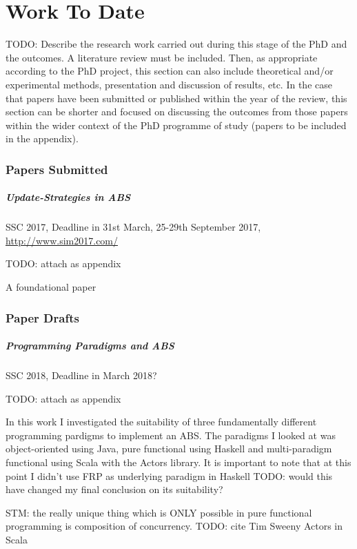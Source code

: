 \chapter{Work To Date}
TODO: Describe the research work carried out during this stage of the PhD and the outcomes. A literature review must be included. Then, as appropriate according to the PhD project, this section can also include theoretical and/or experimental methods, presentation and discussion of results, etc. In the case that papers have been submitted or published within the year of the review, this section can be shorter and focused on discussing the outcomes from those papers within the wider context of the PhD programme of study (papers to be included in the appendix).


\subsection{Papers Submitted}
\paragraph{Update-Strategies in ABS}
SSC 2017, Deadline in 31st March, 25-29th September 2017, \url{http://www.sim2017.com/}


TODO: attach as appendix

A foundational paper

\subsection{Paper Drafts}
\paragraph{Programming Paradigms and ABS}
SSC 2018, Deadline in March 2018?

TODO: attach as appendix

In this work I investigated the suitability of three fundamentally different programming pardigms to implement an ABS. The paradigms I looked at was object-oriented using Java, pure functional using Haskell and multi-paradigm functional using Scala with the Actors library. It is important to note that at this point I didn't use FRP as underlying paradigm in Haskell TODO: would this have changed my final conclusion on its suitability?

STM: the really unique thing which is ONLY possible in pure functional programming is composition of concurrency. TODO: cite Tim Sweeny
Actors in Scala


